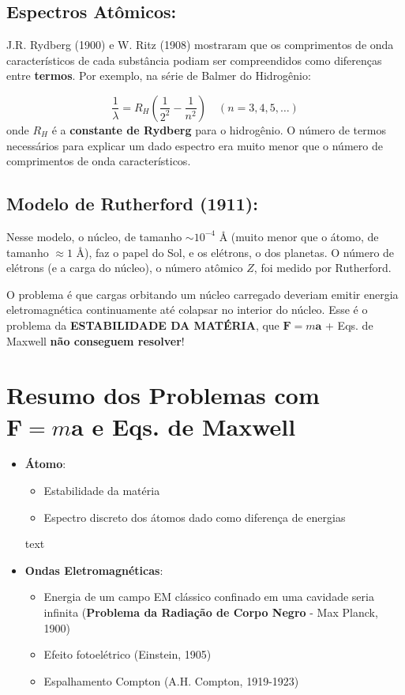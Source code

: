 \subsection*{Espectros Atômicos:}
J.R. Rydberg (1900) e W. Ritz (1908) mostraram que os comprimentos de onda 
característicos de cada substância podiam ser compreendidos como diferenças 
entre \textbf{termos}. Por exemplo, na série de Balmer do Hidrogênio:

\begin{equation}
\frac{1}{\lambda} = R_H \left( \frac{1}{2^2} - \frac{1}{n^2} \right) \quad (n = 
3, 4, 5, \dots)
\end{equation}
onde $R_H$ é a \textbf{constante de Rydberg} para o hidrogênio. O número 
de termos necessários para explicar um dado espectro era muito menor
que o número de comprimentos de onda característicos.

\subsection*{Modelo de Rutherford (1911):}
Nesse modelo, o núcleo, de tamanho $\sim 10^{-4}$ Å (muito menor que o átomo, 
de tamanho $\approx 1$ Å), faz o papel do Sol, e os elétrons, o dos planetas. 
O número de elétrons (e a carga do núcleo), o número atômico $Z$, foi medido 
por Rutherford.

O problema é que cargas orbitando um núcleo carregado deveriam emitir energia
eletromagnética continuamente até colapsar no interior do núcleo. Esse é o 
problema da \textbf{ESTABILIDADE DA MATÉRIA}, que ${\bm F} = m{\bm a}$ + Eqs. 
de Maxwell \textbf{não conseguem resolver}!

\section*{Resumo dos Problemas com ${\bm F} = m{\bm a}$ e Eqs. de Maxwell}
\begin{itemize}
\item \textbf{Átomo}:
\begin{itemize}
\item Estabilidade da matéria
\item Espectro discreto dos átomos dado como diferença de energias
\end{itemize}

text
\item \textbf{Ondas Eletromagnéticas}:
\begin{itemize}
    \item Energia de um campo EM clássico confinado em uma cavidade seria infinita (\textbf{Problema da Radiação de Corpo Negro} - Max Planck, 1900)
    \item Efeito fotoelétrico (Einstein, 1905)
    \item Espalhamento Compton (A.H. Compton, 1919-1923)
\end{itemize}
\end{itemize}


